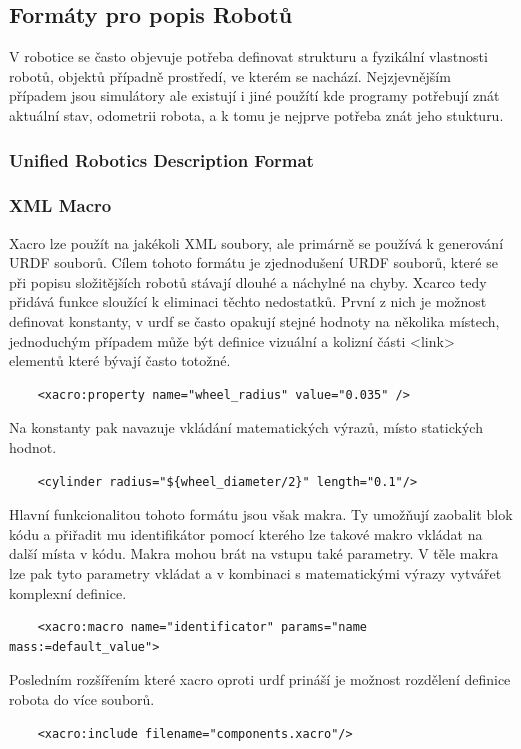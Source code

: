 \subsection*{Formáty pro popis Robotů}
V robotice se často objevuje potřeba definovat strukturu a fyzikální vlastnosti robotů, objektů případně prostředí, ve kterém se nachází. Nejzjevnějším případem jsou simulátory ale existují i jiné použítí kde programy potřebují znát aktuální stav, odometrii robota, a k tomu je nejprve potřeba znát jeho stukturu.

\subsubsection*{Unified Robotics Description Format}


\subsubsection*{XML Macro}
Xacro lze použít na jakékoli XML soubory, ale primárně se používá k generování URDF souborů. Cílem tohoto formátu je zjednodušení URDF souborů, které se při popisu složitějších robotů stávají dlouhé a náchylné na chyby. Xcarco tedy přidává funkce sloužící k eliminaci těchto nedostatků. 
První z nich je možnost definovat konstanty, v urdf se často opakují stejné hodnoty na několika místech, jednoduchým případem může být definice vizuální a kolizní části <link> elementů které bývají často totožné. 
\begin{verbatim}
	<xacro:property name="wheel_radius" value="0.035" />
\end{verbatim}
Na konstanty pak navazuje vkládání matematických výrazů, místo statických hodnot.
\begin{verbatim}
	<cylinder radius="${wheel_diameter/2}" length="0.1"/>
\end{verbatim}
Hlavní funkcionalitou tohoto formátu jsou však makra. Ty umožňují zaobalit blok kódu a přiřadit mu identifikátor pomocí kterého lze takové makro vkládat na další místa v kódu. 
Makra mohou brát na vstupu také parametry. V těle makra lze pak tyto parametry vkládat a v kombinaci s matematickými výrazy vytvářet komplexní definice.
\begin{verbatim}
	<xacro:macro name="identificator" params="name mass:=default_value">
\end{verbatim}
Posledním rozšířením které xacro oproti urdf prináší je možnost rozdělení definice robota do více souborů.
\begin{verbatim}
	<xacro:include filename="components.xacro"/>
\end{verbatim}

